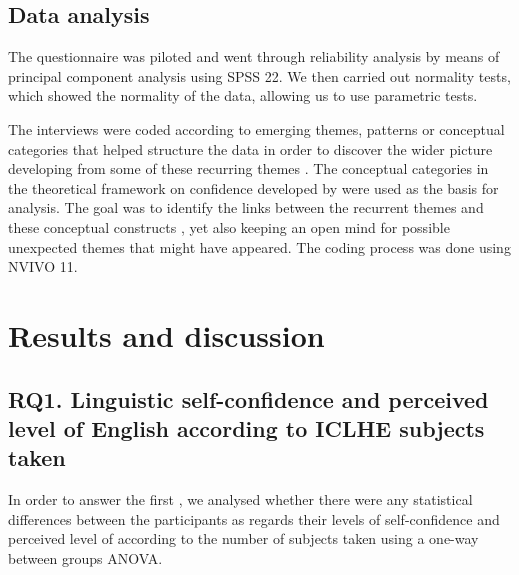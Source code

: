 \documentclass[output=paper]{langsci/langscibook}
\begin{document}
\subsection{Data analysis}

The questionnaire was piloted and went through reliability analysis by means of principal component analysis using SPSS 22. We then carried out normality tests, which showed the normality of the data, allowing us to use parametric tests. 



The interviews were coded according to emerging themes, patterns or conceptual categories that helped structure the data in order to discover the wider picture developing from some of these recurring themes \citep{Saldaña2013}. The conceptual categories in the  theoretical framework on  confidence  developed by \citet{SampasivamClément2014} were used as the basis for  analysis. The goal was to identify the links between the recurrent themes and these conceptual constructs \citep{Pavlenko2007}, yet also keeping an open mind for possible unexpected themes that might have appeared. The coding process was done using NVIVO 11.


\section{Results and discussion}


\subsection{RQ1. Linguistic self-confidence and perceived level of English according to ICLHE subjects taken}

In order to answer the first , we analysed whether there were any statistical differences between the participants as regards their levels of  self-confidence and perceived level of  according to the number of  subjects taken using a one-way between groups ANOVA. 
\end{document}
